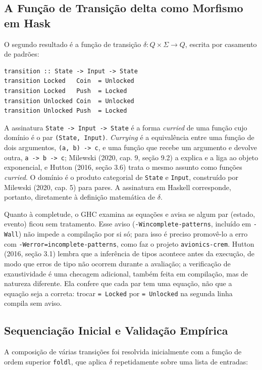 \documentclass[12pt,a4paper]{article}
\begin{document}
\subsection{A Função de Transição delta como Morfismo em Hask}

O segundo resultado é a função de transição $\delta: Q \times \Sigma \to Q$, escrita por casamento de padrões:

\begin{verbatim}
transition :: State -> Input -> State
transition Locked   Coin  = Unlocked
transition Locked   Push  = Locked
transition Unlocked Coin  = Unlocked
transition Unlocked Push  = Locked
\end{verbatim}

A assinatura \texttt{State -> Input -> State} é a forma \textit{curried} de uma função cujo domínio é o par \texttt{(State, Input)}. \textit{Currying} é a equivalência entre uma função de dois argumentos, \texttt{(a, b) -> c}, e uma função que recebe um argumento e devolve outra, \texttt{a -> b -> c}; Milewski (2020, cap. 9, seção 9.2) a explica e a liga ao objeto exponencial, e Hutton (2016, seção 3.6) trata o mesmo assunto como funções \textit{curried}. O domínio é o produto categorial de \texttt{State} e \texttt{Input}, construído por Milewski (2020, cap. 5) para pares. A assinatura em Haskell corresponde, portanto, diretamente à definição matemática de $\delta$.

Quanto à completude, o GHC examina as equações e avisa se algum par (estado, evento) ficou sem tratamento. Esse aviso (\texttt{-Wincomplete-patterns}, incluído em \texttt{-Wall}) não impede a compilação por si só; para isso é preciso promovê-lo a erro com \texttt{-Werror=incomplete-patterns}, como faz o projeto \texttt{avionics-crem}. Hutton (2016, seção 3.1) lembra que a inferência de tipos acontece antes da execução, de modo que erros de tipo não ocorrem durante a avaliação; a verificação de exaustividade é uma checagem adicional, também feita em compilação, mas de natureza diferente. Ela confere que cada par tem uma equação, não que a equação seja a correta: trocar \texttt{= Locked} por \texttt{= Unlocked} na segunda linha compila sem aviso.

\subsection{Sequenciação Inicial e Validação Empírica}

A composição de várias transições foi resolvida inicialmente com a função de ordem superior \texttt{foldl}, que aplica $\delta$ repetidamente sobre uma lista de entradas:
\end{document}
